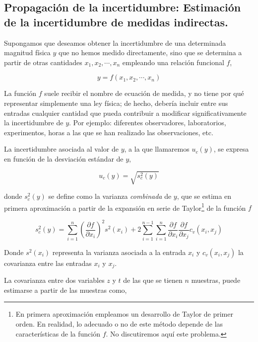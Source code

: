 \subsection{Propagación de la incertidumbre: Estimación de la incertidumbre de medidas indirectas.}

Supongamos que deseamos obtener la incertidumbre de una determinada magnitud física $y$ que no hemos medido directamente, sino que se determina a partir de otras cantidades $x_1,x_2,\cdots,x_n$ empleando una relación funcional $f$,

\begin{equation*}
y = f(x_1,x_2,\cdots,x_n)
\end{equation*}

La función $f$ suele recibir el nombre de ecuación de medida, y no tiene por qué representar simplemente una ley física; de hecho, debería incluir entre sus entradas cualquier cantidad que pueda contribuir a modificar significativamente la incertidumbre de $y$. Por ejemplo: diferentes observadores, laboratorios, experimentos, horas a las que se han realizado las observaciones, etc.

La incertidumbre asociada al valor de $y$, a la que llamaremos $u_c(y)$, se expresa en función de la desviación estándar de $y$,  

\begin{equation*}
u_c(y) =\sqrt{s_c^2(y)}
\end{equation*}


donde  $s_c^2(y)$ se define como la  varianza \emph{combinada} de $y$, que se estima en primera aproximación a partir de la expansión en serie de Taylor\footnote{En primera aproximación empleamos un desarrollo de Taylor de primer orden. En realidad, lo adecuado o no de este método depende de las características de la función $f$. No discutiremos aquí este problema.} de la función $f$	

\begin{equation*}
s_c^2(y) = \sum_{i=1}^n\left(\frac{\partial f}{\partial x_i}\right)^2 s^2(x_i) + 2\sum_{i=1}^{n-1}\sum_{i=1}^n \frac{\partial f}{\partial x_i}\frac{\partial f}{\partial x_j} c_v(x_i,x_j)
\end{equation*}

Donde $s^2(x_i)$  representa la varianza asociada a la entrada $x_i$ y $c_v(x_i, x_j)$ la covarianza entre las entradas $x_i$ y $x_j$. 

La covarianza entre dos variables $z$ y $t$ de las que se tienen $n$ muestras, puede estimarse a partir de las muestras como,

